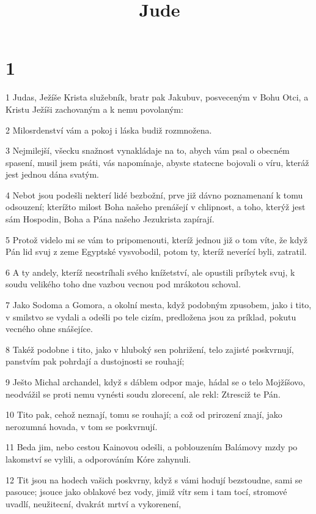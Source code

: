 

\title{Jude}

\chapter{1}

\par 1 Judas, Ježíše Krista služebník, bratr pak Jakubuv, posveceným v Bohu Otci, a Kristu Ježíši zachovaným a k nemu povolaným:
\par 2 Milosrdenství vám a pokoj i láska budiž rozmnožena.
\par 3 Nejmilejší, všecku snažnost vynakládaje na to, abych vám psal o obecném spasení, musil jsem psáti, vás napomínaje, abyste statecne bojovali o víru, kteráž jest jednou dána svatým.
\par 4 Nebot jsou podešli nekterí lidé bezbožní, prve již dávno poznamenaní k tomu odsouzení; kterížto milost Boha našeho prenášejí v chlipnost, a toho, kterýž jest sám Hospodin, Boha a Pána našeho Jezukrista zapírají.
\par 5 Protož videlo mi se vám to pripomenouti, kteríž jednou již o tom víte, že když Pán lid svuj z zeme Egyptské vysvobodil, potom ty, kteríž neverící byli, zatratil.
\par 6 A ty andely, kteríž neostríhali svého knížetství, ale opustili príbytek svuj, k soudu velikého toho dne vazbou vecnou pod mrákotou schoval.
\par 7 Jako Sodoma a Gomora, a okolní mesta, když podobným zpusobem, jako i tito, v smilstvo se vydali a odešli po tele cizím, predložena jsou za príklad, pokutu vecného ohne snášejíce.
\par 8 Takéž podobne i tito, jako v hluboký sen pohrižení, telo zajisté poskvrnují, panstvím pak pohrdají a dustojnosti se rouhají;
\par 9 Ješto Michal archandel, když s dáblem odpor maje, hádal se o telo Mojžíšovo, neodvážil se proti nemu vynésti soudu zlorecení, ale rekl: Ztresciž te Pán.
\par 10 Tito pak, cehož neznají, tomu se rouhají; a což od prirození znají, jako nerozumná hovada, v tom se poskvrnují.
\par 11 Beda jim, nebo cestou Kainovou odešli, a poblouzením Balámovy mzdy po lakomství se vylili, a odporováním Kóre zahynuli.
\par 12 Tit jsou na hodech vašich poskvrny, když s vámi hodují bezstoudne, sami se pasouce; jsouce jako oblakové bez vody, jimiž vítr sem i tam tocí, stromové uvadlí, neužitecní, dvakrát mrtví a vykorenení,

